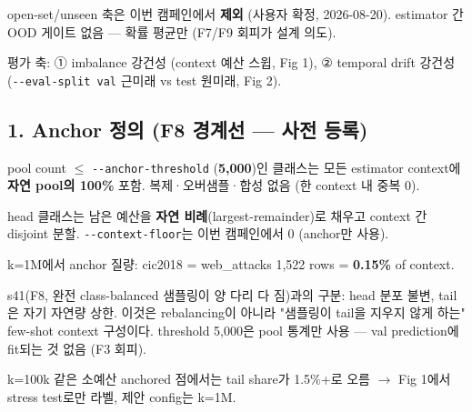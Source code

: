 \par\noindent \textbullet\enspace open-set/\allowbreak{}unseen 축은 이번 캠페인에서 \textbf{제외} (사용자 확정, 2026-08-20). estimator 간 OOD 게이트 없음 — 확률 평균만 (F7/\allowbreak{}F9 회피가 설계 의도).


\par\noindent \textbullet\enspace 평가 축: ① imbalance 강건성 (context 예산 스윕, Fig 1), ② temporal drift 강건성 (\texttt{-\allowbreak{}-\allowbreak{}eval-\allowbreak{}s\allowbreak{}plit val\allowbreak{}} 근미래 vs test 원미래, Fig 2).


\subsection{1. Anchor 정의 (F8 경계선 — 사전 등록)}
\par\noindent \textbullet\enspace pool count \ensuremath{\leq} \texttt{-\allowbreak{}-\allowbreak{}anchor\allowbreak{}-\allowbreak{}thresho\allowbreak{}ld} (\textbf{5,000})인 클래스는 모든 estimator context에 \textbf{자연 pool의 100\%} 포함. 복제·오버샘플·합성 없음 (한 context 내 중복 0).


\par\noindent \textbullet\enspace head 클래스는 남은 예산을 \textbf{자연 비례}(largest-remainder)로 채우고 context 간 disjoint 분할. \texttt{-\allowbreak{}-\allowbreak{}contex\allowbreak{}t-\allowbreak{}floor}는 이번 캠페인에서 0 (anchor만 사용).


\par\noindent \textbullet\enspace k=\allowbreak{}1M에서 anchor 질량: cic2018 =\allowbreak{} web\_\allowbreak{}attacks 1,522 rows =\allowbreak{} \textbf{0.15\%} of context.


\par\noindent \textbullet\enspace s41(F8, 완전 class-balanced 샘플링이 양 다리 다 짐)과의 구분: head 분포 불변, tail은 자기 자연량 상한. 이것은 rebalancing이 아니라 "샘플링이 tail을 지우지 않게 하는" few-shot context 구성이다. threshold 5,000은 pool 통계만 사용 — val prediction에 fit되는 것 없음 (F3 회피).


\par\noindent \textbullet\enspace k=\allowbreak{}100k 같은 소예산 anchored 점에서는 tail share가 1.5\%+\allowbreak{}로 오름  \ensuremath{\rightarrow}  Fig 1에서 stress test로만 라벨, 제안 config는 k=\allowbreak{}1M.


